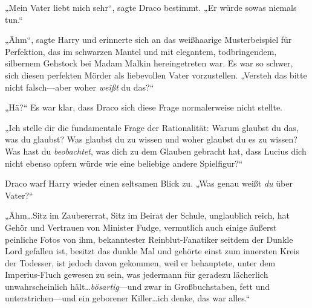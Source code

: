 „Mein Vater liebt mich sehr“, sagte Draco bestimmt. „Er würde sowas niemals tun.“

„Ähm“, sagte Harry und erinnerte sich an das weißhaarige Musterbeispiel für Perfektion, das im schwarzen Mantel und mit elegantem, todbringendem, silbernem Gehstock bei Madam Malkin hereingetreten war. Es war so schwer, sich diesen perfekten Mörder als liebevollen Vater vorzustellen. „Versteh das bitte nicht falsch—aber woher \emph{weißt} du das?“

„Hä?“ Es war klar, dass Draco sich diese Frage normalerweise nicht stellte.

„Ich stelle dir die fundamentale Frage der Rationalität: Warum glaubst du das, was du glaubst? Was glaubst du zu wissen und woher glaubst du es zu wissen? Was hast du \emph{beobachtet}, was dich zu dem Glauben gebracht hat, dass Lucius dich nicht ebenso opfern würde wie eine beliebige andere Spielfigur?“

Draco warf Harry wieder einen seltsamen Blick zu. „Was genau weißt \emph{du} über Vater?“

„Ähm…Sitz im Zaubererrat, Sitz im Beirat der Schule, unglaublich reich, hat Gehör und Vertrauen von Minister Fudge, vermutlich auch einige äußerst peinliche Fotos von ihm, bekanntester Reinblut-Fanatiker seitdem der Dunkle Lord gefallen ist, besitzt das dunkle Mal und gehörte einst zum innersten Kreis der Todesser, ist jedoch davon gekommen, weil er behauptete, unter dem Imperius-Fluch gewesen zu sein, was jedermann für geradezu lächerlich unwahrscheinlich hält…\emph{bösartig}—und zwar in Großbuchstaben, fett und unterstrichen—und ein geborener Killer…ich denke, das war alles.“

